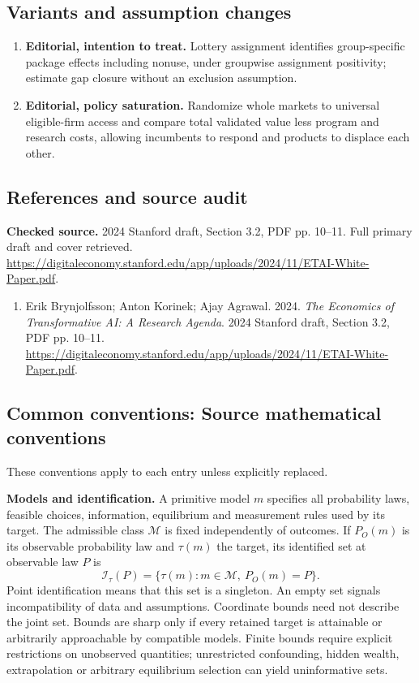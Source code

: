 \documentclass[11pt,a4paper]{article}
\begin{document}
\subsection*{Variants and assumption changes}
\begin{enumerate}
\item \textbf{Editorial, intention to treat.} Lottery assignment identifies group-specific package effects including nonuse, under groupwise assignment positivity; estimate gap closure without an exclusion assumption.
\item \textbf{Editorial, policy saturation.} Randomize whole markets to universal eligible-firm access and compare total validated value less program and research costs, allowing incumbents to respond and products to displace each other.
\end{enumerate}
\subsection*{References and source audit}
\textbf{Checked source.} 2024 Stanford draft, Section 3.2, PDF pp. 10--11. Full primary draft and cover retrieved. \url{https://digitaleconomy.stanford.edu/app/uploads/2024/11/ETAI-White-Paper.pdf}.
\begin{enumerate}\raggedright
\item\hypertarget{definitions:source:30007694:1}{} Erik Brynjolfsson; Anton Korinek; Ajay Agrawal. 2024. \emph{The Economics of Transformative AI: A Research Agenda}. 2024 Stanford draft, Section 3.2, PDF pp. 10--11.
\url{https://digitaleconomy.stanford.edu/app/uploads/2024/11/ETAI-White-Paper.pdf}.
\end{enumerate}

\subsection*{Common conventions: Source mathematical conventions}

These conventions apply to each entry unless explicitly replaced.

\textbf{Models and identification.} A primitive model \(m\) specifies all probability laws, feasible choices, information, equilibrium and measurement rules used by its target. The admissible class \(\mathcal M\) is fixed independently of outcomes. If \(P_O(m)\) is its observable probability law and \(\tau(m)\) the target, its identified set at observable law \(P\) is
\[
 \mathcal I_\tau(P)=\{\tau(m):m\in\mathcal M,\ P_O(m)=P\}.
\]
Point identification means that this set is a singleton. An empty set signals incompatibility of data and assumptions. Coordinate bounds need not describe the joint set. Bounds are sharp only if every retained target is attainable or arbitrarily approachable by compatible models. Finite bounds require explicit restrictions on unobserved quantities; unrestricted confounding, hidden wealth, extrapolation or arbitrary equilibrium selection can yield uninformative sets.
\end{document}
